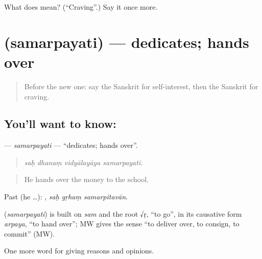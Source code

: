 \begin{tcolorbox}[breakable,colback=teal!4,colframe=teal!35!black,title={Before you move on}]
What does  mean? (\textquotedblleft{}Craving\textquotedblright{}.) Say it once more.
\end{tcolorbox}
\section[\texorpdfstring{\sk{समर्पयति} (samarpayati)}{समर्पयति (samarpayati)}]{ (samarpayati) — dedicates; hands over}

\label{lesson:SA-C359-samarpayati}



\begin{quote}
Before the new one: say the Sanskrit for self-interest, then the Sanskrit for craving.
\end{quote}

\subsection*{You'll want to know: }
\textbf{} — \emph{samarpayati} — \textquotedblleft{}dedicates; hands over\textquotedblright{}.

\begin{quote}
   
\end{quote}

\begin{quote}
\emph{saḥ dhanaṃ vidyālayāya samarpayati.}
\end{quote}

\begin{quote}
He hands over the money to the school.
\end{quote}

Past (he …):   , \emph{saḥ gṛhaṃ samarpitavān}.

\begin{cousinweb}
\textbf{} (\emph{samarpayati}) is built on \emph{sam} and the root √ṛ, \textquotedblleft{}to go\textquotedblright{}, in its causative form \emph{arpaya}, \textquotedblleft{}to hand over\textquotedblright{}; MW gives the sense \textquotedblleft{}to deliver over, to consign, to commit\textquotedblright{} (MW).
\end{cousinweb}

\begin{grammarlens}[title={What you've built}]
One more word for giving reasons and opinions.
\end{grammarlens}

